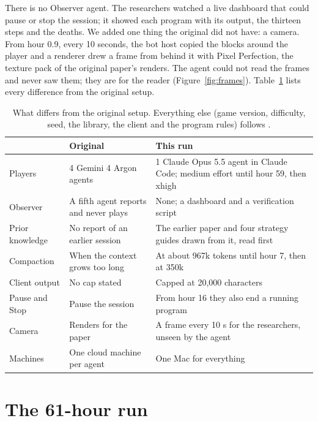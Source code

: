 \documentclass[11pt,a4paper]{article}
\begin{document}
There is no Observer agent. The researchers watched a live dashboard that could pause or stop the session; it showed each program with its output, the thirteen steps and the deaths. We added one thing the original did not have: a camera. From hour 0.9, every 10 seconds, the bot host copied the blocks around the player and a renderer drew a frame from behind it with Pixel Perfection, the texture pack of the original paper's renders. The agent could not read the frames and never saw them; they are for the reader (Figure~\ref{fig:frames}). Table~\ref{tab:setup} lists every difference from the original setup.

\begin{table}[t]
  \caption{What differs from the original setup. Everything else (game version, difficulty, seed, the library, the client and the program rules) follows \citet{faldor2026team}.}
  \label{tab:setup}
  \small
  \begin{tabularx}{\textwidth}{@{}p{2.6cm}XX@{}}
    \toprule
    & \textbf{Original} & \textbf{This run} \\
    \midrule
    Players & 4 Gemini 4 Argon agents & 1 Claude Opus 5.5 agent in Claude Code; medium effort until hour 59, then xhigh \\
    Observer & A fifth agent reports and never plays & None; a dashboard and a verification script \\
    Prior knowledge & No report of an earlier session & The earlier paper and four strategy guides drawn from it, read first \\
    Compaction & When the context grows too long & At about 967k tokens until hour 7, then at 350k \\
    Client output & No cap stated & Capped at 20,000 characters \\
    Pause and Stop & Pause the session & From hour 16 they also end a running program \\
    Camera & Renders for the paper & A frame every 10 s for the researchers, unseen by the agent \\
    Machines & One cloud machine per agent & One Mac for everything \\
    \bottomrule
  \end{tabularx}
\end{table}

\section{The 61-hour run}
\end{document}
